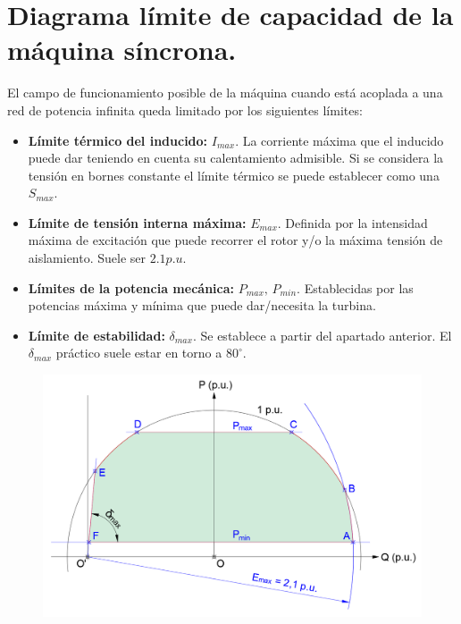 	\section{Diagrama límite de capacidad de la máquina síncrona.} \label{sec:diagramaLimite}
		El campo de funcionamiento posible de la máquina cuando está acoplada a una red de potencia infinita queda limitado por los siguientes límites:
		\begin{itemize}
			\item \textbf{Límite térmico del inducido:} $I_{max}$. La corriente máxima que el inducido puede dar teniendo en cuenta su calentamiento admisible. Si se considera la tensión en bornes constante el límite térmico se puede establecer como una $S_{max}$.
			
			\item \textbf{Límite de tensión interna máxima:} $E_{max}$. Definida por la intensidad máxima de excitación que puede recorrer el rotor y/o la máxima tensión de aislamiento. Suele ser $2.1 p.u.$
			
			\item \textbf{Límites de la potencia mecánica:} $P_{max},\,P_{min}$. Establecidas por las potencias máxima y mínima que puede dar/necesita la turbina.
			
			\item \textbf{Límite de estabilidad:} $\delta_{max}$. Se establece a partir del apartado anterior. El $\delta_{max}$ práctico suele estar en torno a $80^\circ$.
		\end{itemize}
			
		\begin{figure}[H]
			\centering
			\includegraphics[width=0.8\linewidth]{res/tema6/diagramaCapacidad}
			\label{fig:diagramacapacidad}
		\end{figure}
		
